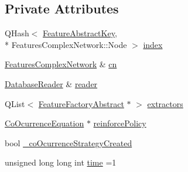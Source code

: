 \subsection*{Private Attributes}
\begin{DoxyCompactItemize}
\item 
Q\+Hash$<$ \hyperlink{class_feature_abstract_key}{Feature\+Abstract\+Key}, \\*
Features\+Complex\+Network\+::\+Node $>$ \hyperlink{class_complex_network_constructor_a1eb20c95af12f063ecbc3052eb03a00a}{index}
\item 
\hyperlink{class_features_complex_network}{Features\+Complex\+Network} \& \hyperlink{class_complex_network_constructor_aa099456a58edc5c1885323061206b3e6}{cn}
\item 
\hyperlink{class_database_reader}{Database\+Reader} \& \hyperlink{class_complex_network_constructor_ad223ad7e464ff159d91a89deb4e943cc}{reader}
\item 
Q\+List$<$ \hyperlink{class_feature_factory_abstract}{Feature\+Factory\+Abstract} $\ast$ $>$ \hyperlink{class_complex_network_constructor_ae79b538a8b9253cd71de5fef1be1c18a}{extractors}
\item 
\hyperlink{class_co_ocurrence_equation}{Co\+Ocurrence\+Equation} $\ast$ \hyperlink{class_complex_network_constructor_a1048d40ab65e87ad58267144642b66cd}{reinforce\+Policy}
\item 
bool \hyperlink{class_complex_network_constructor_a56a1a391bdbd14e4f9a9c19125205bf9}{\+\_\+co\+Ocurrence\+Strategy\+Created}
\item 
unsigned long long int \hyperlink{class_complex_network_constructor_afc016404ca7dda4b05807e3ca004c308}{time} =1
\end{DoxyCompactItemize}


